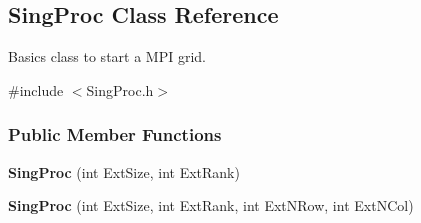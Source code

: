 \hypertarget{classSingProc}{}\subsection{Sing\+Proc Class Reference}
\label{classSingProc}


Basics class to start a M\+PI grid.  




{\ttfamily \#include $<$Sing\+Proc.\+h$>$}

\subsubsection*{Public Member Functions}
\begin{DoxyCompactItemize}
\item 
{\bfseries Sing\+Proc} (int Ext\+Size, int Ext\+Rank)\hypertarget{classSingProc_a41b0fe4066dfd42b65fc6f14ef94aac0}{}\label{classSingProc_a41b0fe4066dfd42b65fc6f14ef94aac0}

\item 
{\bfseries Sing\+Proc} (int Ext\+Size, int Ext\+Rank, int Ext\+N\+Row, int Ext\+N\+Col)\hypertarget{classSingProc_a402d8b08f74011e92861be136eba3f1e}{}\label{classSingProc_a402d8b08f74011e92861be136eba3f1e}

\end{DoxyCompactItemize}
